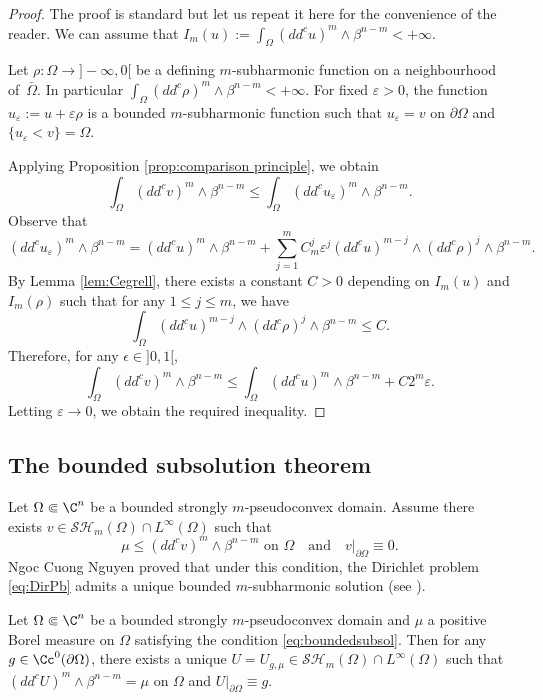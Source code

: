 \begin{proof} The proof is standard but let us repeat it here for the convenience of the reader.
We can assume that $I_m (u):= \int_{\Omega}(dd^c u)^m\wedge\beta^{n-m} < + \infty$.

Let $\rho: \Omega \to{} ]- \infty,0[$ be a defining $m$-subharmonic function on a neighbourhood of~$\bar \Omega$. In particular $\int_{\Omega}(dd^c \rho)^m\wedge\beta^{n-m} < + \infty$.
For fixed $\varepsilon > 0$, the function $u_\varepsilon:= u + \varepsilon \rho$ is a bounded $m$-subharmonic function such that $u_\varepsilon = v$ on $\partial \Omega$ and $\{u_\varepsilon < v\} = \Omega$.

Applying Proposition \ref{prop:comparison principle}, we obtain
\[
\int_{\Omega}(dd^c v)^m\wedge\beta^{n-m} \leq \int_{\Omega}(dd^c u_\varepsilon)^m\wedge\beta^{n-m}.
\]
Observe that
\[
(dd^c u_\varepsilon)^m\wedge\beta^{n-m} = (dd^c u)^m\wedge\beta^{n-m} + \sum_{j = 1}^m C_m^j \varepsilon^j (dd^c u)^{m - j} \wedge (dd^c \rho)^j \wedge \beta^{n -m}.
\]
By Lemma \ref{lem:Cegrell}, there exists a constant $C > 0 $ depending on $I_m (u)$ and $I_m (\rho)$ such that for any $1 \leq j \leq m$, we have
\[
\int_\Omega (dd^c u)^{m - j} \wedge (dd^c \rho)^j \wedge \beta^{n -m} \leq C.
\]
Therefore, for any $\epsilon\in{}]0,1[$,
\[
\int_{\Omega}(dd^c v)^m\wedge\beta^{n-m} \leq \int_{\Omega}(dd^c u)^m\wedge\beta^{n-m} + C 2^m \varepsilon.
\]
Letting $\varepsilon \to 0$, we obtain the required inequality.
\end{proof}

\subsection{The bounded subsolution theorem}

Let $\Omega \Subset \C^n$ be a bounded strongly $m$\nobreakdash-pseudoconvex domain. Assume there exists $v \in \mathcal{SH}_m (\Omega)\cap L^{\infty} (\Omega)$ such that
\begin{equation} \label{eq:boundedsubsol}
\mu \leq (dd^c v)^m \wedge \beta^{n -m} \text{ on } \Omega \quad\text{and}\quad v|_{\partial \Omega} \equiv 0.
\end{equation}
Ngoc Cuong Nguyen proved that under this condition, the Dirichlet problem \eqref{eq:DirPb} admits a unique bounded $m$-subharmonic solution (see \cite{N13}).

\begin{theorem}[\cite{N13}] \label{thm:boundedsubsolution}Let $\Omega \Subset \C^n$ be a bounded strongly $m$-pseudoconvex domain and $\mu$ a positive Borel measure on $\Omega$ satisfying the condition \eqref{eq:boundedsubsol}. Then for any $g \in \Cc^0 (\partial \Omega)$, there exists a unique $U = U_{g,\mu} \in \mathcal{SH}_m (\Omega)\cap L^{\infty} (\Omega)$ such that $(dd^c U)^m \wedge \beta^{n -m} = \mu$ on $\Omega$ and $U|_{\partial \Omega} \equiv g$.
\end{theorem}

